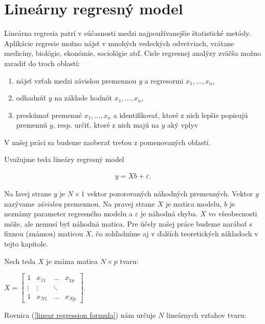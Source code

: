 \section{Lineárny regresný model}
\label{linear regression}
 
Lineárna regresia patrí v súčasnosti medzi najpoužívanejšie štatistické metódy. Aplikácie regresie možno nájsť v mnohých vedeckých odvetviach, 
vrátane medicíny, biológie, ekonómie, sociológie atď. Ciele regresnej analýzy zväčša možno zaradiť do troch oblastí:

\begin{enumerate}
  \item nájsť vzťah medzi závislou premennou $y$ a regresormi $x_1, \ldots, x_n$,
  \item odhadnúť $y$ na základe hodnôt $x_1, \ldots, x_n$,
  \item preskúmať premenné $x_1, \ldots, x_n$ a identifikovať, ktoré z nich lepšie popisujú premennú $y$, resp. určiť, ktoré z nich majú na $y$ aký vplyv
\end{enumerate}

V našej práci sa budeme zaoberať treťou z pomenovaných oblastí.

Uvažujme teda lineáry regresný model

\begin{align}
\label{linear regression formula}
y = Xb + \varepsilon .
\end{align}

Na ľavej strane $y$ je $N \times 1$ vektor pozorovaných náhodných premenných. Vektor $y$ nazývame \emph{závislou} premennou.
Na pravej strane $X$ je matica modelu, $b$ je neznámy parameter regresného modelu a $\varepsilon$ je náhodná chyba.
$X$ vo všeobecnosti môže, ale nemusí byť náhodná matica. Pre účely našej práce budeme narábať s fixnou (známou) maticou $X$,
čo zohľadníme aj v ďalších teoretických základoch v tejto kapitole.

Nech teda $X$ je známa matica $N \times p$ tvaru:

\begin{center}
$
X =
\begin{bmatrix}
1 & x_{11} & \ldots & x_{1p} \\
\vdots & \vdots & \ddots & \\
1 & x_{N1} & \ldots & x_{Np} 
\end{bmatrix}
$.
\end{center}

Rovnica (\ref{linear regression formula}) nám určuje $N$ lineárnych vzťahov tvaru:

